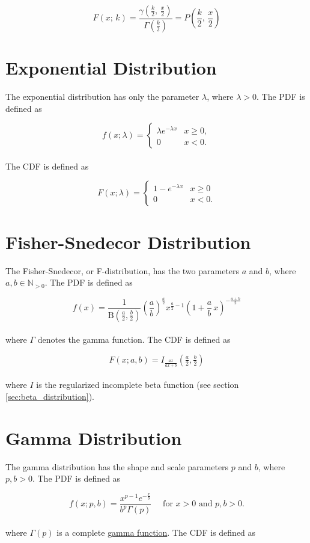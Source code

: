 		$$F(x;\,k) = \frac{\gamma(\frac{k}{2},\,\frac{x}{2})}{\Gamma(\frac{k}{2})} = P\left(\frac{k}{2},\,\frac{x}{2}\right)$$


	\section{Exponential Distribution}

		The exponential distribution has only the parameter $\lambda$, where $\lambda > 0$. The \ac{PDF} is defined as

		$$f(x;\lambda) = \begin{cases} \lambda e^{-\lambda x} & x \ge 0, \\ 0 & x < 0. \end{cases}$$
		\\[0.3cm]
		The \ac{CDF} is defined as

		$$F(x;\lambda) = \begin{cases} 1-e^{-\lambda x} & x \ge 0 \\ 0 & x < 0. \end{cases}$$

	\section{Fisher-Snedecor Distribution} 

		The Fisher-Snedecor, or F-distribution, has the two parameters $a$ and $b$, where $a,b \in \mathbb{N}_{>0}$. The \ac{PDF} is defined as

		$$
			f(x) = \frac{1}{\mathrm{B}\!\left(\frac{a}{2},\frac{b}{2}\right)} \left(\frac{a}{b}\right)^{\frac{a}{2}} x^{\frac{a}{2} - 1} \left(1+\frac{a}{b}\,x\right)^{-\frac{a+b}{2}}
		$$
		\\[0.3cm]
		where $\Gamma$ denotes the gamma function.
		The \ac{CDF} is defined as

		$$F(x; a,b)=I_{\frac{a x}{a x + b}}\left (\tfrac{a}{2}, \tfrac{b}{2} \right)$$
		\\[0.3cm]
		where $I$ is the regularized incomplete beta function (see section \ref{sec:beta_distribution}).

	\section{Gamma Distribution}

		The gamma distribution has the shape and scale parameters $p$ and $b$, where $p,b > 0$. The \ac{PDF} is defined as

		$$f(x;p,b) =  \frac{x^{p-1}e^{-\frac{x}{b}}}{b^p\Gamma(p)} \quad \text{ for } x > 0 \text{ and } p, b > 0.$$
		\\[0.3cm]
		where $\Gamma(p)$ is a complete \href{https://en.wikipedia.org/wiki/Gamma_function}{gamma function}.		The \ac{CDF} is defined as

